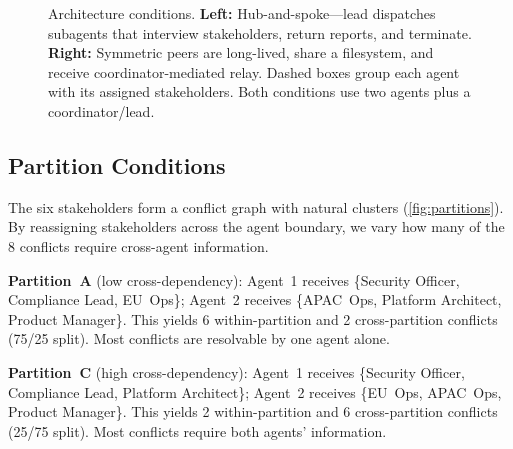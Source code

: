 \documentclass[11pt,letterpaper]{article}
\begin{document}
\begin{figure}[t]
  \caption{Architecture conditions. \textbf{Left:} Hub-and-spoke---lead
    dispatches subagents that interview stakeholders, return reports,
    and terminate. \textbf{Right:} Symmetric peers are long-lived,
    share a filesystem, and receive coordinator-mediated relay.
    Dashed boxes group each agent with its assigned stakeholders.
    Both conditions use two agents plus a coordinator/lead.}
  \label{fig:architecture}
\end{figure}

\subsection{Partition Conditions}

The six stakeholders form a conflict graph with natural clusters
(\cref{fig:partitions}). By reassigning stakeholders across the agent
boundary, we vary how many of the 8 conflicts require cross-agent
information.

\textbf{Partition~A} (low cross-dependency): Agent~1 receives
\{Security Officer, Compliance Lead, EU~Ops\}; Agent~2 receives
\{APAC~Ops, Platform Architect, Product Manager\}. This yields 6
within-partition and 2 cross-partition conflicts (75/25 split). Most
conflicts are resolvable by one agent alone.

\textbf{Partition~C} (high cross-dependency): Agent~1 receives
\{Security Officer, Compliance Lead, Platform Architect\}; Agent~2
receives \{EU~Ops, APAC~Ops, Product Manager\}. This yields 2
within-partition and 6 cross-partition conflicts (25/75 split).
Most conflicts require both agents' information.
\end{document}
